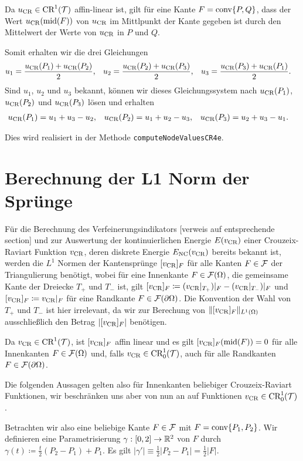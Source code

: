 Da $u_\textup{CR}\in\textup{CR}^1(\mathcal{T})$ affin-linear ist, gilt für eine Kante
$F=\textup{conv}\{P,Q\}$, dass der Wert $u_\textup{CR}(\textup{mid}(F))$ von $u_\textup{CR}$ im Mittlpunkt 
der Kante gegeben ist durch den Mittelwert der Werte von $u_\textup{CR}$ in $P$ und $Q$.

Somit erhalten wir die drei Gleichungen
\begin{align*}
  u_1 &= \frac{u_\textup{CR}(P_1)+u_\textup{CR}(P_2)}{2},  
  &u_2 &= \frac{u_\textup{CR}(P_2)+u_\textup{CR}(P_3)}{2},  
  &u_3 &= \frac{u_\textup{CR}(P_3)+u_\textup{CR}(P_1)}{2}.
\end{align*}
Sind $u_1$, $u_2$ und $u_3$ bekannt, können wir dieses Gleichungssystem nach 
$u_\textup{CR}(P_1)$, $u_\textup{CR}(P_2)$ und $u_\textup{CR}(P_3)$ lösen und erhalten
\begin{align*}
 u_\textup{CR}(P_1)&=u_1+u_3-u_2, &u_\textup{CR}(P_2)&= u_1+u_2-u_3,&u_\textup{CR}(P_3)&=u_2+u_3-u_1.
\end{align*}

Dies wird realisiert in der Methode \texttt{computeNodeValuesCR4e}.

\section{Berechnung der L1 Norm der Sprünge}
Für die Berechnung des Verfeinerungsindikators [verweis auf entsprechende
section] und zur Auswertung der kontinuierlichen Energie $E(v_\textup{CR})$ einer 
Crouzeix-Raviart Funktion $v_\textup{CR}$, deren diskrete Energie $E_\textup{NC}(v_\textup{CR})$
bereits bekannt ist, werden die $L^1$ Normen der Kantensprünge 
$[v_\textup{CR}]_F$ für alle Kanten $F\in\mathcal{F}$ der Triangulierung benötigt,
wobei für eine Innenkante $F\in\mathcal{F}(\Omega)$, die gemeinsame Kante der
Dreiecke $T_+$ und $T_-$ ist, gilt
$[v_\textup{CR}]_F\coloneqq (v_\textup{CR}|_{T_+})|_F-(v_\textup{CR}|_{T_-})|_F$
und $[v_\textup{CR}]_F \coloneqq v_\textup{CR}|_F$ für eine Randkante
$F\in\mathcal{F}(\partial\Omega)$. Die Konvention der Wahl von
$T_+$ und $T_-$ ist hier irrelevant, da wir
zur Berechung von $\Vert [v_\textup{CR}]_F\Vert_{L^1(\Omega)}$
ausschließlich den Betrag $|[v_\textup{CR}]_F|$ benötigen.

Da $v_\textup{CR}\in\textup{CR}^1(\mathcal{T})$,
ist $[v_\textup{CR}]_F$ affin linear und es gilt $[v_\textup{CR}]_F(\textup{mid}(F))=0$ für 
alle Innenkanten $F\in\mathcal{F}(\Omega)$ und, falls 
$v_\textup{CR}\in\textup{CR}^1_0(\mathcal{T})$, auch für alle Randkanten $F\in\mathcal{F}(\partial\Omega)$.

Die folgenden Aussagen gelten also für Innenkanten beliebiger
Crouzeix-Raviart Funktionen, wir beschränken uns aber von nun
an auf Funktionen $v_\textup{CR}\in\textup{CR}^1_0(\mathcal{T})$.

Betrachten wir also eine beliebige Kante $F\in\mathcal{F}$
mit $F=\textup{conv}\{P_1,P_2\}$. 
Wir definieren eine Parametrisierung $\gamma:[0,2]\to\mathbb{R}^2$ von $F$ durch
$\gamma(t)\coloneqq \frac{t}{2}(P_2-P_1)+P_1$. 
Es gilt $|\gamma'|\equiv \frac{1}{2}|P_2-P_1|=\frac{1}{2}|F|$.

